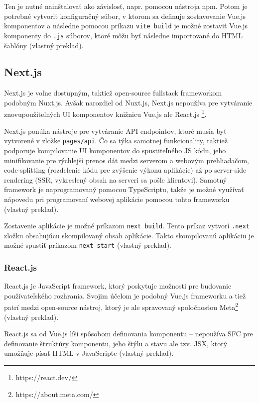 Ten je nutné nainštalovať ako závislosť, napr. pomocou nástroja npm. Potom je potrebné vytvoriť konfiguračný súbor, v ktorom sa definuje zostavovanie Vue.js komponentov a následne pomocou príkazu \texttt{vite build} je možné zostaviť Vue.js komponenty do \texttt{.js} súborov, ktoré môžu byť následne importované do HTML šablóny \cite{vuejs_introduction} (vlastný preklad).

\clearpage

\subsection {Next.js}
Next.js je voľne dostupným, taktiež open-source fullstack frameworkom podobným Nuxt.js. Avšak narozdiel od Nuxt.js, Next.js nepoužíva pre vytváranie znovupoužiteľných UI komponentov knižnicu Vue.js ale React.js \footnote{https://react.dev/}.

Next.js ponúka nástroje pre vytváranie API endpointov, ktoré musia byť vytvorené v zložke \texttt{pages/api}. Čo sa týka samotnej funkcionality, taktiež podporuje kompilovanie UI komponentov do spustiteľného JS kódu, jeho minifikovanie pre rýchlejší prenos dát medzi serverom a webovým prehliadačom, code-splitting (rozdelenie kódu pre zvýšenie výkonu aplikácie) až po server-side rendering (SSR, vykreslený obsah na serveri sa pošle klientovi). Samotný framework je naprogramovaný pomocou TypeScriptu, takže je možné využívať nápovedu pri programovaní webovej aplikácie pomocou tohto frameworku \cite{nextjs_introduction} (vlastný preklad).

Zostavenie aplikácie je možné príkazom \texttt{next build}. Tento príkaz vytvorí \texttt{.next} zložku obsahujúcu skompilovaný obsah aplikácie. Takto skompilovanú aplikáciu je možné spustiť príkazom \texttt{next start} \cite{nextjs_introduction} (vlastný preklad). 

\subsubsection {React.js}
React.js je JavaScript framework, ktorý poskytuje možnosti pre budovanie používateľského rozhrania. Svojim účelom je podobný Vue.js frameworku a tiež patrí medzi open-source nástroj, ktorý je ale spravovaný spoločnosťou Meta\footnote{https://about.meta.com/} \cite{about_react} (vlastný preklad).

React.js sa od Vue.js líši spôsobom definovania komponentu -- nepoužíva SFC pre definovanie štruktúry komponentu, jeho štýlu a stavu ale tzv. JSX, ktorý umožňuje písať HTML v JavaScripte \cite{about_react} (vlastný preklad). \clearpage

